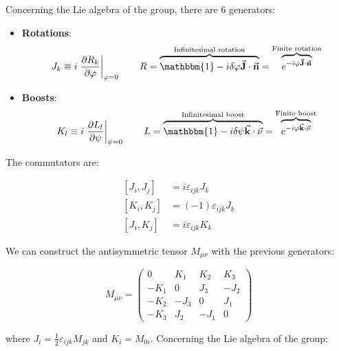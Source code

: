 \documentclass[../../main/main.tex]{subfiles}
\begin{document}
Concerning the Lie algebra of the group, there are 6 generators:
\begin{itemize}
    \item \textbf{Rotations}:
        \begin{equation}
            J_k \equiv i \left. \pdv{R_k}{\varphi} \right|_{\varphi = 0}
            \qquad
            R = \overbrace{\mathbbm{1} - i \delta \varphi \va{J} \cdot \va{n} }^{\text{Infinitesimal rotation}}
            = \overbrace{e^{-i \varphi \va{J} \cdot \va{n}} }^{\text{Finite rotation}}
            \label{eq:}
        \end{equation}

    \item \textbf{Boosts}:
    \begin{equation}
        K_l \equiv i \left. \pdv{L_l}{\psi} \right|_{\psi = 0}
        \qquad
        L = \overbrace{\mathbbm{1} - i \delta \psi \va{k} \cdot \va{\nu} }^{\text{Infinitesimal boost}}
        = \overbrace{e^{-i \varphi \va{k} \cdot \va{\nu}} }^{\text{Finite boost}}
        \label{eq:}
    \end{equation}
\end{itemize}

The commutators are:

\begin{subequations}
    \begin{align}
        [J_i,J_j]   &=  i \varepsilon _{ijk} J_k    \\
        [K_i,K_j]   &=  (-1) \varepsilon _{ijk} J_k \\
        [J_i,K_j]   &=  i \varepsilon _{ijk} K_k
    \end{align}
    \label{}
\end{subequations}

We can construct the antisymmetric tensor \( M_{\mu \nu} \) with the previous generators:

\begin{equation}
    M_{\mu \nu } =
    \begin{pmatrix}
    0   & K_1  & K_2  & K_3 \\
    -K_1   & 0  & J_3  & -J_2 \\
    -K_2   & -J_3  & 0  & J_1 \\
    -K_3   & J_2   & -J_1   & 0
    \end{pmatrix}
    \label{eq:}
\end{equation}

where \( J_i = \frac{1}{2} \varepsilon _{ijk} M_{jk} \) and \( K_i = M_{0i} \). Concerning the Lie algebra of the group:
\end{document}
